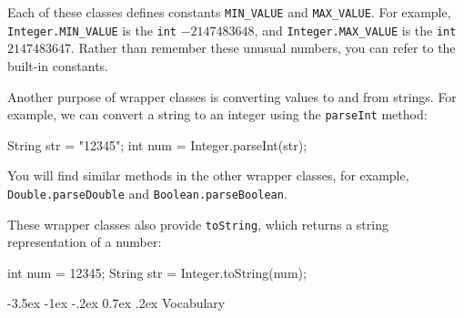 \documentclass[12pt]{book}
\makeatletter
\theoremstyle{exercise}
\newcommand{\java}[1]{\verb"#1"}
\renewcommand{\section}{\@startsection{section}{1}{\z@}%
    {-3.5ex \@plus -1ex \@minus -.2ex}%
    {0.7ex \@plus.2ex}%
    {\normalfont\Large\bfseries}}
\newcommand{\java}[1]{\lstinline{#1}} %
\makeatother
\begin{document}
Each of these classes defines constants \java{MIN_VALUE} and \java{MAX_VALUE}.
For example, \java{Integer.MIN_VALUE} is the \java{int} $-2147483648$, and \java{Integer.MAX_VALUE} is the \java{int} $2147483647$.
Rather than remember these unusual numbers, you can refer to the built-in constants.

Another purpose of wrapper classes is converting values to and from strings.
For example, we can convert a string to an integer using the \java{parseInt} method:

\begin{code}
String str = "12345";
int num = Integer.parseInt(str);
\end{code}

You will find similar methods in the other wrapper classes, for example, \java{Double.parseDouble} and \java{Boolean.parseBoolean}.

These wrapper classes also provide \java{toString}, which returns a string representation of a number:

\begin{code}
int num = 12345;
String str = Integer.toString(num);
\end{code}







\section{Vocabulary}
\end{document}
